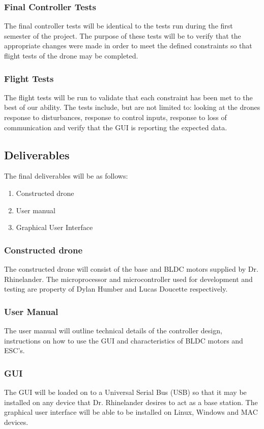 \subsubsection{Final Controller Tests}
The final controller tests will be identical to the tests run during the first semester of the project. The purpose of these tests will be to verify that the appropriate changes were made in order to meet the defined constraints so that flight tests of the drone may be completed. 

\subsubsection{Flight Tests}
The flight tests will be run to validate that each constraint has been met to the best of our ability. The tests include, but are not limited to: looking at the drones response to disturbances, response to control inputs, response to loss of communication and verify that the GUI is reporting the expected data. 

\subsection{Deliverables}
The final deliverables will be as follows: 
\begin{enumerate}
	\item Constructed drone
	\item User manual
	\item Graphical User Interface
\end{enumerate}
\subsubsection{Constructed drone}
The constructed drone will consist of the base and BLDC motors supplied by Dr. Rhinelander. The microprocessor and microcontroller used for development and testing are property of Dylan Humber and Lucas Doucette respectively. 
\subsubsection{User Manual}
The user manual will outline technical details of the controller design, instructions on how to use the GUI and characteristics of BLDC motors and ESC's. 
\subsubsection{GUI}
The GUI will be loaded on to a Universal Serial Bus (USB) so that it may be installed on any device that Dr. Rhinelander  desires to act as a base station. The graphical user interface will be able to be installed on Linux, Windows and MAC devices.

 



	
